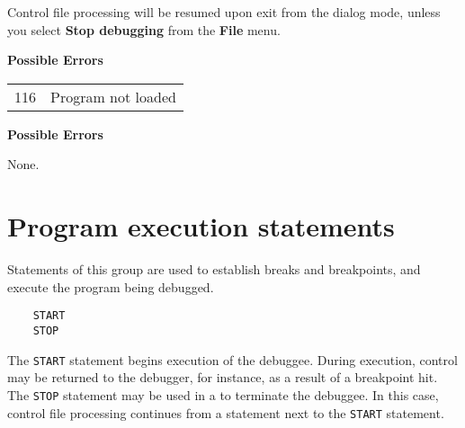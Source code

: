 
Control file processing will be resumed upon exit from the dialog mode,
unless you select {\bf Stop debugging} from the {\bf File} menu.

{\samepage
{\bf Possible Errors}
\begin{flushleft}
\begin{tabular}{ll}
116 & Program not loaded \\
\end{tabular}
\end{flushleft}
} %
{} %


{\samepage
{\bf Possible Errors}

None.

} %
{} %

\pagebreak[1]
\section{Program execution statements}

Statements of this group are used to establish breaks and breakpoints,
and execute the program being debugged.

{\samepage
{}\label{batch:START}\label{batch:STOP}
\begin{verbatim}
    START
    STOP
\end{verbatim}
The \verb'START' statement begins execution of the debuggee. During execution,
control may be returned to the debugger, for instance, as a result of
a breakpoint hit. The \verb'STOP' statement may be used in a  to
terminate the debuggee. In this case, control file processing continues from
a statement next to the \verb'START' statement.
} %


